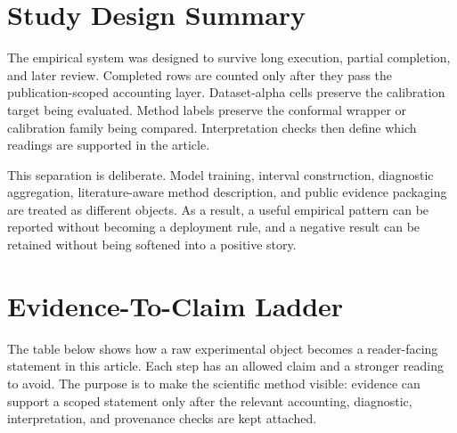 \documentclass[11pt]{article}
\begin{document}
\section{Study Design Summary}

The empirical system was designed to survive long execution, partial completion, and later review. Completed rows are counted only after they pass the publication-scoped accounting layer. Dataset-alpha cells preserve the calibration target being evaluated. Method labels preserve the conformal wrapper or calibration family being compared. Interpretation checks then define which readings are supported in the article.

This separation is deliberate. Model training, interval construction, diagnostic aggregation, literature-aware method description, and public evidence packaging are treated as different objects. As a result, a useful empirical pattern can be reported without becoming a deployment rule, and a negative result can be retained without being softened into a positive story.

\section{Evidence-To-Claim Ladder}

The table below shows how a raw experimental object becomes a reader-facing statement in this article. Each step has an allowed claim and a stronger reading to avoid. The purpose is to make the scientific method visible: evidence can support a scoped statement only after the relevant accounting, diagnostic, interpretation, and provenance checks are kept attached.
\end{document}
